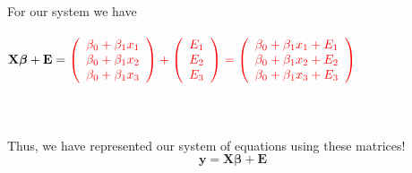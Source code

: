 \begin{enumerate}
For our system we have \\~\\
$\textbf{X}\boldsymbol{\beta}+\textbf{E}=%
\textcolor{red}{\left(\begin{array}{c}\beta_0+\beta_1x_1\\\beta_0+\beta_1x_2\\\beta_0+\beta_1x_3\end{array}\right)+\left(\begin{array}{c}E_1\\E_2\\E_3\end{array}\right)=\left(\begin{array}{c}\beta_0+\beta_1x_1+E_1\\\beta_0+\beta_1x_2+E_2\\\beta_0+\beta_1x_3+E_3\end{array}\right)}$\\~\\~\\~\\
Thus, we have represented our system of equations using these matrices!
$$\textbf{y}=\textbf{X}\boldsymbol{\beta}+\textbf{E}$$~\\


\end{enumerate}

